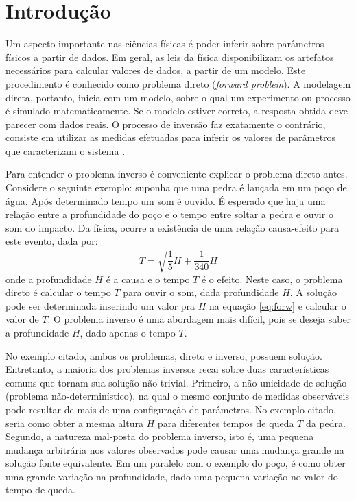 \chapter{Introdução}
\label{cap:1intro}

Um aspecto importante nas ciências físicas é poder inferir sobre parâmetros
físicos a partir de dados. Em geral, as leis da física disponibilizam os
artefatos necessários para calcular valores de dados, a partir de um modelo.
Este procedimento é conhecido como problema direto (\textit{forward problem}).
A modelagem direta, portanto, inicia com um modelo, sobre o qual um experimento ou processo
é simulado matematicamente. Se o modelo estiver correto, a resposta
obtida deve parecer com dados reais. O processo de inversão faz exatamente o contrário,
consiste em utilizar as medidas efetuadas para inferir os valores de parâmetros que
caracterizam o sistema \citep{tarantola}.

Para entender o problema inverso é conveniente explicar o problema direto antes.
Considere o seguinte exemplo: suponha que uma pedra é lançada em um poço de água.
Após determinado tempo um som é ouvido. É esperado que haja uma relação entre a
profundidade do poço e o tempo entre soltar a pedra e ouvir o som do impacto. Da física,
ocorre a existência de uma relação causa-efeito para este evento, dada por:
\begin{equation}
\label{eq:forw}
T = \sqrt{\frac{1}{5}H} + \frac{1}{340}H
\end{equation}
onde a profundidade $H$ é a causa e o tempo $T$ é o efeito.
Neste caso, o problema direto é calcular o tempo $T$ para ouvir o som, dada profundidade $H$.
A solução pode ser determinada inserindo um valor pra $H$ na equação \ref{eq:forw} e calcular o
valor de $T$. O problema inverso é uma abordagem mais difícil, pois se deseja
saber a profundidade $H$, dado apenas o tempo $T$.

No exemplo citado, ambos os problemas, direto e inverso, possuem solução. Entretanto,
a maioria dos problemas inversos recai sobre duas características
comuns que tornam sua solução não-trivial. Primeiro, a não unicidade de solução
(problema não-determinístico), na qual o mesmo conjunto de medidas
observáveis pode resultar de mais de uma configuração de parâmetros. No exemplo
citado, seria como obter a mesma altura $H$ para diferentes tempos
de queda $T$ da pedra. Segundo, a natureza mal-posta do problema inverso, isto é,
uma pequena mudança arbitrária nos valores observados pode causar uma mudança grande
na solução fonte equivalente. Em um paralelo com o exemplo do poço, é como
obter uma grande variação na profundidade, dado uma pequena variação no valor do tempo de queda.

